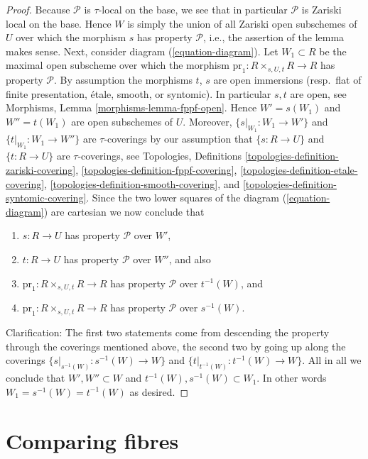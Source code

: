 \begin{proof}
Because $\mathcal{P}$ is $\tau$-local on the base, we see that in particular
$\mathcal{P}$ is Zariski local on the base. Hence $W$ is simply the union
of all Zariski open subschemes of $U$ over which the morphism $s$ has property
$\mathcal{P}$, i.e., the assertion of the lemma makes sense.
Next, consider
diagram (\ref{equation-diagram}).
Let $W_1 \subset R$ be the maximal open subscheme over which the morphism
$\text{pr}_1 : R \times_{s, U, t} R \to R$ has property $\mathcal{P}$.
By assumption the morphisms $t$, $s$ are open immersions
(resp.\ flat of finite presentation, \'etale, smooth, or syntomic).
In particular $s, t$ are open, see
Morphisms, Lemma \ref{morphisms-lemma-fppf-open}.
Hence $W' = s(W_1)$ and $W'' = t(W_1)$ are open subschemes of $U$.
Moreover, $\{s|_{W_1} : W_1 \to W'\}$ and $\{t|_{W_1} : W_1 \to W''\}$
are $\tau$-coverings by our assumption that
$\{s : R \to U\}$ and $\{t : R \to U\}$ are $\tau$-coverings, see
Topologies, Definitions
\ref{topologies-definition-zariski-covering},
\ref{topologies-definition-fppf-covering},
\ref{topologies-definition-etale-covering},
\ref{topologies-definition-smooth-covering}, and
\ref{topologies-definition-syntomic-covering}.
Since the two lower squares of the
diagram (\ref{equation-diagram})
are cartesian we now conclude that
\begin{enumerate}
\item $s : R \to U$ has property $\mathcal{P}$ over $W'$,
\item $t : R \to U$ has property $\mathcal{P}$ over $W''$, and also
\item $\text{pr}_1 : R \times_{s, U, t} R \to R$ has property
$\mathcal{P}$ over $t^{-1}(W)$, and
\item $\text{pr}_1 : R \times_{s, U, t} R \to R$ has property
$\mathcal{P}$ over $s^{-1}(W)$.
\end{enumerate}
Clarification: The first two statements come from descending the property
through the coverings mentioned above, the second two by going up along the
coverings $\{s|_{s^{-1}(W)} : s^{-1}(W) \to W\}$ and
$\{t|_{t^{-1}(W)} : t^{-1}(W) \to W\}$.
All in all we conclude that
$W', W'' \subset W$ and $t^{-1}(W), s^{-1}(W) \subset W_1$. In other words
$W_1 = s^{-1}(W) = t^{-1}(W)$ as desired.
\end{proof}



\section{Comparing fibres}
\label{section-fibres}


